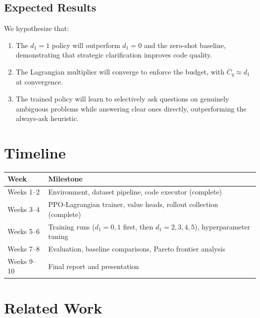 \documentclass[11pt]{article}
\begin{document}
\subsection{Expected Results}

We hypothesize that:
\begin{enumerate}[nosep]
  \item The $d_1 = 1$ policy will outperform $d_1 = 0$ and the zero-shot baseline, demonstrating that strategic clarification improves code quality.
  \item The Lagrangian multiplier will converge to enforce the budget, with $\overline{C}_q \approx d_1$ at convergence.
  \item The trained policy will learn to selectively ask questions on genuinely ambiguous problems while answering clear ones directly, outperforming the always-ask heuristic.
\end{enumerate}

\section{Timeline}

\begin{table}[h]
\centering
\small
\begin{tabular}{@{}ll@{}}
\toprule
\textbf{Week} & \textbf{Milestone} \\
\midrule
Weeks 1--2 & Environment, dataset pipeline, code executor (complete) \\
Weeks 3--4 & PPO-Lagrangian trainer, value heads, rollout collection (complete) \\
Weeks 5--6 & Training runs ($d_1 = 0, 1$ first, then $d_1 = 2, 3, 4, 5$), hyperparameter tuning \\
Weeks 7--8 & Evaluation, baseline comparisons, Pareto frontier analysis \\
Weeks 9--10 & Final report and presentation \\
\bottomrule
\end{tabular}
\end{table}

\section{Related Work}
\end{document}
